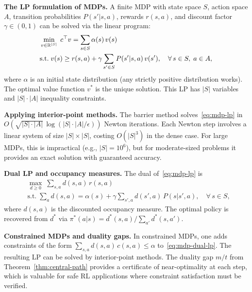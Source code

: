 \documentclass[11pt,a4paper]{article}
\begin{document}
\begin{rlconnection}[title={Interior-Point Methods for MDPs}]
\textbf{The LP formulation of MDPs.}
A finite MDP with state space $S$, action space $A$, transition
probabilities $P(s'|s,a)$, rewards $r(s,a)$, and discount factor
$\gamma \in (0,1)$ can be solved via the linear program:
\begin{equation}\label{eq:mdp-lp}
\begin{aligned}
  &\min_{v \in \mathbb{R}^{|S|}}\; c^\top v
  = \sum_{s \in S} \alpha(s)\, v(s) \\
  &\text{s.t.}\; v(s) \ge r(s,a) + \gamma \sum_{s' \in S}
    P(s'|s,a)\,v(s'), \quad \forall\, s \in S,\; a \in A,
\end{aligned}
\end{equation}
where $\alpha$ is an initial state distribution (any strictly positive
distribution works). The optimal value function $v^*$ is the unique
solution. This LP has $|S|$ variables and $|S| \cdot |A|$ inequality
constraints.

\textbf{Applying interior-point methods.}
The barrier method solves~\eqref{eq:mdp-lp} in
$O(\sqrt{|S| \cdot |A|}\,\log(|S| \cdot |A|/\epsilon))$ Newton
iterations. Each Newton step involves a linear system of size
$|S| \times |S|$, costing $O(|S|^3)$ in the dense case. For
large MDPs, this is impractical (e.g., $|S| = 10^6$), but for
moderate-sized problems it provides an exact solution with
guaranteed accuracy.

\textbf{Dual LP and occupancy measures.}
The dual of~\eqref{eq:mdp-lp} is
\begin{equation}\label{eq:mdp-dual-lp}
\begin{aligned}
  &\max_{d \ge 0}\; \sum_{s,a} d(s,a)\, r(s,a) \\
  &\text{s.t.}\; \sum_a d(s,a) = \alpha(s)
    + \gamma \sum_{s',a} d(s',a)\, P(s|s',a), \quad \forall\, s \in S,
\end{aligned}
\end{equation}
where $d(s,a)$ is the discounted occupancy measure. The optimal policy
is recovered from $d^*$ via $\pi^*(a|s) = d^*(s,a)/\sum_{a'} d^*(s,a')$.

\textbf{Constrained MDPs and duality gaps.}
In constrained MDPs, one adds constraints of the form
$\sum_{s,a} d(s,a)\,c(s,a) \le \alpha$ to~\eqref{eq:mdp-dual-lp}.
The resulting LP can be solved by interior-point methods. The duality
gap $m/t$ from Theorem~\ref{thm:central-path} provides a certificate
of near-optimality at each step, which is valuable for safe RL
applications where constraint satisfaction must be verified.
\end{rlconnection}
\end{document}
